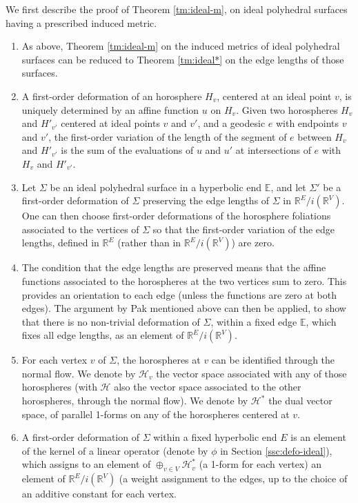 \documentclass[notitlepage,twoside,a4paper]{amsart}
\theoremstyle{named}
\newcommand{\R}{{\mathbb R}}
\newcommand{\bE}{{\mathbb E}}
\newcommand{\cH}{{\mathcal H}}
\begin{document}
We first describe the proof of Theorem \ref{tm:ideal-m}, on ideal polyhedral surfaces having a prescribed induced metric. 

\begin{enumerate}
\item As above, Theorem \ref{tm:ideal-m} on the induced metrics of ideal polyhedral surfaces can be reduced to Theorem \ref{tm:ideal*} on the edge lengths of those surfaces.
\item A first-order deformation of an horosphere $H_v$, centered at an ideal point $v$, is uniquely determined by an affine function $u$ on $H_v$. Given two horospheres $H_v$ and $H'_{v'}$ centered at  ideal points $v$ and $v'$, and a geodesic $e$ with endpoints $v$ and $v'$, the first-order variation of the length of the segment of $e$ between $H_v$ and $H'_{v'}$ is the sum of the evaluations of $u$ and $u'$ at intersections of $e$ with $H_v$ and $H'_{v'}$. 
\item Let $\Sigma$ be an ideal polyhedral surface in a hyperbolic end $\bE$, and let $\Sigma'$ be a first-order deformation of $\Sigma$ preserving the edge lengths of $\Sigma$ in $\R^E/i(\R^V)$. One can then choose first-order deformations of the horosphere foliations associated to the vertices of $\Sigma$ so that the first-order variation of the edge lengths, defined in $\R^E$ (rather than in $\R^E/i(\R^V)$) are zero.
\item The condition that the edge lengths are preserved means that the affine functions associated to the horospheres at the two vertices sum to zero. This provides an orientation to each edge (unless the functions are zero at both edges). The argument by Pak mentioned above can then be applied, to show that there is no non-trivial deformation of $\Sigma$, within a fixed edge $\bE$, which fixes all edge lengths, as an element of $\R^E/i(\R^V)$.  
\item For each vertex $v$ of $\Sigma$, the horospheres at $v$ can be identified through the normal flow. We denote by $\cH_v$ the vector space associated with any of those horospheres (with $\cH$ also the vector space associated to the other horospheres, through the normal flow). We denote by $\cH^*$ the dual vector space, of parallel 1-forms on any of the horospheres centered at $v$. 
\item A first-order deformation of $\Sigma$ within a fixed hyperbolic end $E$ is an element of the kernel of a linear operator (denote by $\phi$ in Section \ref{ssc:defo-ideal}), which assigns to an element of $\oplus_{v\in V}\cH^*_v$ (a 1-form for each vertex) an element of $\R^E/i(\R^V)$ (a weight assignment to the edges, up to the choice of an additive constant for each vertex.

\end{enumerate}
\end{document}
